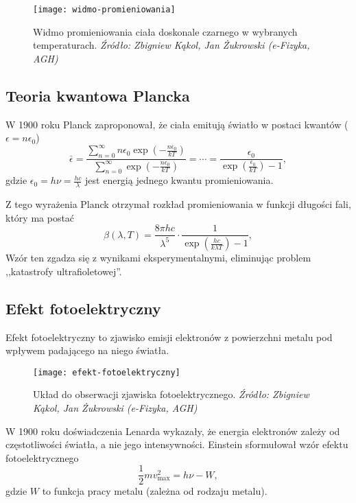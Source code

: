 \begin{figure}[H]
    \centering
    \texttt{[image: widmo-promieniowania]}
    \caption{Widmo promieniowania ciała doskonale czarnego w wybranych temperaturach. \textit{Źródło: Zbigniew Kąkol, Jan Żukrowski (e-Fizyka, AGH)}}
    \label{fig:widmo-promieniowania}
\end{figure}

\subsection{Teoria kwantowa Plancka}
W 1900 roku Planck zaproponował, że ciała emitują światło w postaci kwantów ($\epsilon = n\epsilon_0$)
\begin{equation*}
    \bar{\epsilon} = \frac{\sum\limits_{n=0}^{\infty} n\epsilon_0 \exp(-\frac{n\epsilon_0}{kT})}{\sum\limits_{n=0}^{\infty} \exp(-\frac{n\epsilon_0}{kT})} = \cdots = \frac{\epsilon_0}{\exp(\frac{\epsilon_0}{kT}) - 1},
\end{equation*}
gdzie \(\epsilon_0 = h \nu = \frac{h c}{\lambda}\) jest energią jednego kwantu promieniowania.

Z tego wyrażenia Planck otrzymał rozkład promieniowania w funkcji długości fali, który ma postać
\begin{equation*}
    \beta(\lambda, T) = \frac{8\pi hc}{\lambda^5} \cdot \frac{1}{\exp(\frac{hc}{k\lambda T}) - 1},
\end{equation*}
Wzór ten zgadza się z wynikami eksperymentalnymi, eliminując problem ,,katastrofy ultrafioletowej''.

\subsection{Efekt fotoelektryczny}
Efekt fotoelektryczny to zjawisko emisji elektronów z powierzchni metalu pod wpływem padającego na niego światła.

\begin{figure}[H]
    \centering
    \texttt{[image: efekt-fotoelektryczny]}
    \caption{Układ do obserwacji zjawiska fotoelektrycznego. \textit{Źródło: Zbigniew Kąkol, Jan Żukrowski (e-Fizyka, AGH)}}
    \label{fig:efekt-fotoelektryczny}
\end{figure}

W 1900 roku doświadczenia Lenarda wykazały, że energia elektronów zależy od częstotliwości światła, a nie jego intensywności.
Einstein sformułował wzór efektu fotoelektrycznego
\begin{equation*}
    \frac{1}{2} m v_{\max}^2 = h\nu - W,
\end{equation*}
gdzie $W$ to funkcja pracy metalu (zależna od rodzaju metalu).


